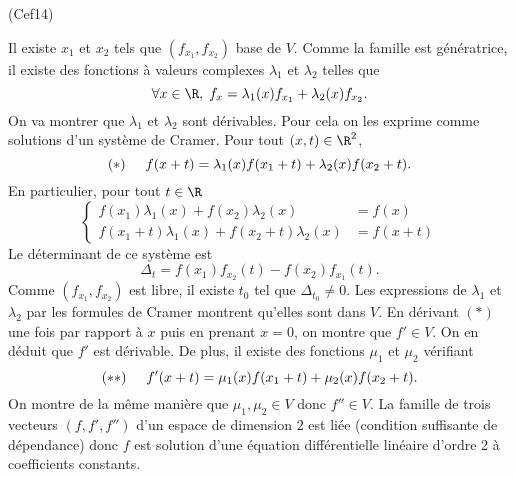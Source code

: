\begin{tiny}(Cef14)\end{tiny} Il existe $x_1$ et $x_2$ tels que $(f_{x_1},f_{x_2})$ base de $V$.\newline
Comme la famille est génératrice, il existe des fonctions à valeurs complexes $\lambda_1$ et $\lambda_2$ telles que
\[
 \forall x \in \R, \; f_x = \lambda_1(x)f_{x_1} + \lambda_2(x)f_{x_2}.
\]
On va montrer que $\lambda_1$ et $\lambda_2$ sont dérivables. Pour cela on les exprime comme solutions d'un système de Cramer. Pour tout $(x,t) \in \R^2$,
\[
 (*)\hspace{0.5cm} f(x+t) = \lambda_1(x)f(x_1 + t) + \lambda_2(x)f(x_2 + t).
\]
En particulier, pour tout $t\in \R$
\[
 \left\lbrace 
 \begin{aligned}
  f(x_1)\lambda_1(x) + f(x_2)\lambda_2(x) &= f(x) \\
  f(x_1+t)\lambda_1(x) + f(x_2+t)\lambda_2(x) &= f(x+t)
 \end{aligned}
\right. 
\]
Le déterminant de ce système est
\[
 \Delta_t = f(x_1)f_{x_2}(t) - f(x_2)f_{x_1}(t).
\]
Comme $(f_{x_1},f_{x_2})$ est libre, il existe $t_0$ tel que $\Delta_{t_0}\neq 0$. Les expressions de $\lambda_1$ et $\lambda_2$  par les formules de Cramer montrent qu'elles sont dans $V$.\newline
En dérivant $(*)$ une fois par rapport à $x$ puis en prenant $x=0$, on montre que $f'\in V$. On en déduit que $f'$ est dérivable. De plus, il existe des fonctions $\mu_1$ et $\mu_2$ vérifiant 
\[
 (**)\hspace{0.5cm} f'(x+t) = \mu_1(x)f(x_1 + t) + \mu_2(x)f(x_2 + t).
\]
On montre de la même manière que $\mu_1, \mu_2 \in V$ donc $f''\in V$.\newline
La famille de trois vecteurs $(f,f',f'')$ d'un espace de dimension $2$ est liée (condition suffisante de dépendance) donc $f$ est solution d'une équation différentielle linéaire d'ordre 2 à coefficients constants.
